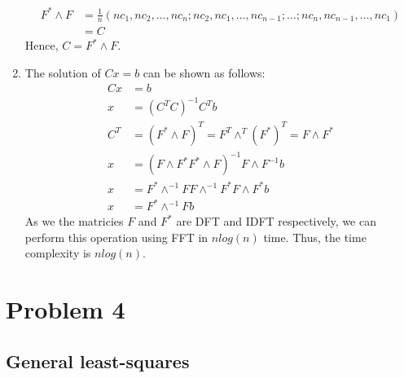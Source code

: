 \documentclass{article}
\begin{document}
\begin{enumerate}[label=\alph*]
\begin{align*}
        F^*\wedge F &= \frac{1}{n}(nc_1,nc_2,\ldots,nc_n;nc_2,nc_1,\ldots,nc_{n-1};\ldots;nc_n,nc_{n-1},\ldots,nc_1)\\
        &= C
    \end{align*}
    Hence, $C=F^*\wedge F$.
    \item The solution of $Cx=b$ can be shown as follows:
    \begin{align*}
        Cx&=b\\
        x &= (C^TC)^{-1}C^Tb\\
        C^T &= (F^*\wedge F)^T = F^T\wedge^T (F^*)^T = F\wedge F^*\\
        x &= (F\wedge F^* F^* \wedge F)^{-1}F\wedge F^{-1}b\\
        x &= F^*\wedge^{-1}FF\wedge^{-1}F^*F\wedge F^*b\\
        x &= F^*\wedge^{-1}Fb
    \end{align*}
    As we the matricies $F$ and $F^*$ are DFT and IDFT respectively, we can perform this operation using FFT in $nlog(n)$ time. Thus, the time complexity is $nlog(n)$.
\end{enumerate}

\section*{Problem 4}
\subsection*{General least-squares}
\end{document}
